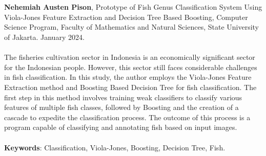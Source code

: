 \chapter*{}
\singlespacing{}

\textbf{Nehemiah Austen Pison}, Prototype of Fish Genus Classification System 
Using Viola-Jones Feature Extraction and Decision Tree Based Boosting, Computer Science Program, Faculty of 
Mathematics and Natural Sciences, State University of Jakarta. January 2024.
\\
\\

The fisheries cultivation sector in Indonesia is an 
economically significant sector for the Indonesian 
people. However, this sector still faces considerable 
challenges in fish classification. In this study, the 
author employs the Viola-Jones Feature Extraction method 
and Boosting Based Decision Tree for fish classification. 
The first step in this method involves training weak 
classifiers to classify various features of multiple 
fish classes, followed by Boosting and the creation 
of a cascade to expedite the classification process. 
The outcome of this process is a program capable of 
classifying and annotating fish based on input images.
\\
\\
\textbf{Keywords}: Classification, Viola-Jones, Boosting, Decision Tree, Fish.